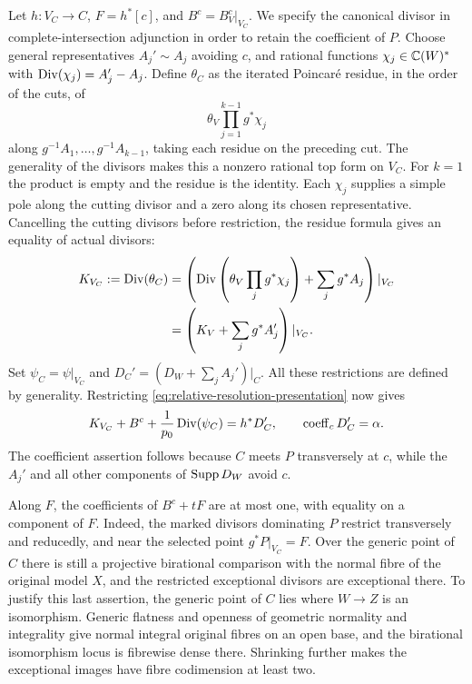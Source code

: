 Let $h:V_C\to C$, $F=h^*[c]$, and $B^c=B_V^c|_{V_C}$.  We specify the
canonical divisor in complete-intersection adjunction in order to retain
the coefficient of $P$.  Choose general representatives $A_j'\sim A_j$
avoiding $c$, and rational functions $\chi_j\in\mathbb C(W)^*$ with
$\operatorname{Div}(\chi_j)=A_j'-A_j$.  Define $\theta_C$ as the iterated Poincar\'e
residue, in the order of the cuts, of
\[
 \theta_V\prod_{j=1}^{k-1}g^*\chi_j
\]
along $g^{-1}A_1,\ldots,g^{-1}A_{k-1}$, taking each residue on the
preceding cut.  The generality of the divisors makes this a nonzero
rational top form on $V_C$.  For $k=1$ the product is empty and the residue
is the identity.  Each $\chi_j$ supplies a simple pole along the cutting
divisor and a zero along its chosen representative.  Cancelling the cutting
divisors before restriction, the residue formula gives an equality of
actual divisors:
\[
\begin{aligned}
 K_{V_C}:=\operatorname{Div}(\theta_C)
     &=\left(\operatorname{Div}\left(\theta_V\prod_jg^*\chi_j\right)
                   +\sum_jg^*A_j\right)|_{V_C}\\
     &=\left(K_V+\sum_jg^*A_j'\right)|_{V_C}.
\end{aligned}
\]
Set $\psi_C=\psi|_{V_C}$ and $D_C'=(D_W+\sum_jA_j')|_C$.  All these
restrictions are defined by generality.  Restricting
\eqref{eq:relative-resolution-presentation} now gives
\begin{equation}\label{eq:relative-curve-presentation}
 K_{V_C}+B^c+\frac1{p_0}\operatorname{Div}(\psi_C)=h^*D'_C,
 \qquad \operatorname{coeff}_c D'_C=\alpha.
\end{equation}
The coefficient assertion follows because $C$ meets $P$ transversely at
$c$, while the $A_j'$ and all other components of $\operatorname{Supp} D_W$ avoid $c$.

Along $F$, the coefficients of $B^c+tF$ are at most one, with equality on a
component of $F$.  Indeed, the marked divisors dominating $P$ restrict
transversely and reducedly, and near the selected point
$g^*P|_{V_C}=F$.  Over the generic point of $C$ there is still a projective
birational comparison with the normal fibre of the original model $X$,
and the restricted exceptional divisors are exceptional there.  To justify
this last assertion, the generic point of $C$ lies where $W\to Z$ is an
isomorphism.  Generic flatness and openness of geometric normality and
integrality give normal integral original fibres on an open base, and the
birational isomorphism locus is fibrewise dense there.  Shrinking further
makes the exceptional images have fibre codimension at least two.

